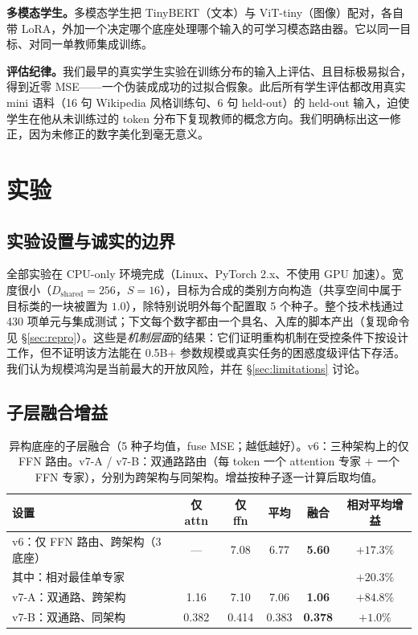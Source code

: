 \documentclass[10pt,twoside]{article}
\begin{document}
\textbf{多模态学生。}多模态学生把 TinyBERT（文本）与 ViT-tiny（图像）配对，各自带 LoRA，外加一个决定哪个底座处理哪个输入的可学习模态路由器。它以同一目标、对同一单教师集成训练。

\textbf{评估纪律。}我们最早的真实学生实验在训练分布的输入上评估、且目标极易拟合，得到近零 MSE——一个伪装成成功的过拟合假象。此后所有学生评估都改用真实 mini 语料（16 句 Wikipedia 风格训练句、6 句 held-out）的 held-out 输入，迫使学生在他从未训练过的 token 分布下复现教师的概念方向。我们明确标出这一修正，因为未修正的数字美化到毫无意义。

\section{实验}
\label{sec:exp}

\subsection{实验设置与诚实的边界}
\label{sec:exp-setup}

全部实验在 CPU-only 环境完成（Linux、PyTorch 2.x、不使用 GPU 加速）。宽度很小（$D_{\text{shared}}{=}256$，$S{=}16$），目标为合成的类别方向构造（共享空间中属于目标类的一块被置为 $1.0$），除特别说明外每个配置取 5 个种子。整个技术栈通过 430 项单元与集成测试；下文每个数字都由一个具名、入库的脚本产出（复现命令见 \S\ref{sec:repro}）。这些是\emph{机制层面}的结果：它们证明重构机制在受控条件下按设计工作，但不证明该方法能在 0.5B+ 参数规模或真实任务的困惑度级评估下存活。我们认为规模鸿沟是当前最大的开放风险，并在 \S\ref{sec:limitations} 讨论。

\subsection{子层融合增益}
\label{sec:fusion-exp}

\begin{table}[t]
\centering
\caption{异构底座的子层融合（5 种子均值，fuse MSE；越低越好）。v6：三种架构上的仅 FFN 路由。v7-A / v7-B：双通路路由（每 token 一个 attention 专家 $+$ 一个 FFN 专家），分别为跨架构与同架构。增益按种子逐一计算后取均值。}
\label{tab:fusion}
\small
\setlength{\tabcolsep}{4.5pt}
\begin{tabular}{lccccc}
\toprule
\textbf{设置} & \textbf{仅 attn} & \textbf{仅 ffn} & \textbf{平均} & \textbf{融合} & \textbf{相对平均增益} \\
\midrule
v6：仅 FFN 路由、跨架构（3 底座） & --- & 7.08 & 6.77 & \textbf{5.60} & $+17.3\%$ \\
\quad 其中：相对最佳单专家 & & & & & $+20.3\%$ \\
v7-A：双通路、跨架构 & 1.16 & 7.10 & 7.06 & \textbf{1.06} & $+84.8\%$ \\
v7-B：双通路、同架构 & 0.382 & 0.414 & 0.383 & \textbf{0.378} & $+1.0\%$ \\
\bottomrule
\end{tabular}
\end{table}
\end{document}
